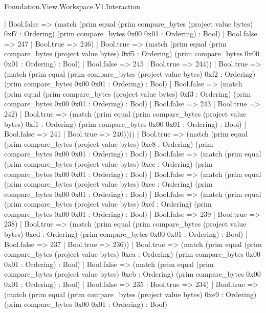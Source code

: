 \begin{lexlean}{Foundation.View.Workspace.V1.Interaction}
\begin{semanticmodule}
{                  | Bool.false => (match (prim equal (prim compare_bytes (project value bytes) 0xf7 : Ordering) (prim compare_bytes 0x00 0x01 : Ordering) : Bool)
                    | Bool.false => 247
                    | Bool.true => 246)
                  | Bool.true => (match (prim equal (prim compare_bytes (project value bytes) 0xf5 : Ordering) (prim compare_bytes 0x00 0x01 : Ordering) : Bool)
                    | Bool.false => 245
                    | Bool.true => 244))
                | Bool.true => (match (prim equal (prim compare_bytes (project value bytes) 0xf2 : Ordering) (prim compare_bytes 0x00 0x01 : Ordering) : Bool)
                  | Bool.false => (match (prim equal (prim compare_bytes (project value bytes) 0xf3 : Ordering) (prim compare_bytes 0x00 0x01 : Ordering) : Bool)
                    | Bool.false => 243
                    | Bool.true => 242)
                  | Bool.true => (match (prim equal (prim compare_bytes (project value bytes) 0xf1 : Ordering) (prim compare_bytes 0x00 0x01 : Ordering) : Bool)
                    | Bool.false => 241
                    | Bool.true => 240))))
            | Bool.true => (match (prim equal (prim compare_bytes (project value bytes) 0xe8 : Ordering) (prim compare_bytes 0x00 0x01 : Ordering) : Bool)
              | Bool.false => (match (prim equal (prim compare_bytes (project value bytes) 0xec : Ordering) (prim compare_bytes 0x00 0x01 : Ordering) : Bool)
                | Bool.false => (match (prim equal (prim compare_bytes (project value bytes) 0xee : Ordering) (prim compare_bytes 0x00 0x01 : Ordering) : Bool)
                  | Bool.false => (match (prim equal (prim compare_bytes (project value bytes) 0xef : Ordering) (prim compare_bytes 0x00 0x01 : Ordering) : Bool)
                    | Bool.false => 239
                    | Bool.true => 238)
                  | Bool.true => (match (prim equal (prim compare_bytes (project value bytes) 0xed : Ordering) (prim compare_bytes 0x00 0x01 : Ordering) : Bool)
                    | Bool.false => 237
                    | Bool.true => 236))
                | Bool.true => (match (prim equal (prim compare_bytes (project value bytes) 0xea : Ordering) (prim compare_bytes 0x00 0x01 : Ordering) : Bool)
                  | Bool.false => (match (prim equal (prim compare_bytes (project value bytes) 0xeb : Ordering) (prim compare_bytes 0x00 0x01 : Ordering) : Bool)
                    | Bool.false => 235
                    | Bool.true => 234)
                  | Bool.true => (match (prim equal (prim compare_bytes (project value bytes) 0xe9 : Ordering) (prim compare_bytes 0x00 0x01 : Ordering) : Bool)
}
\end{semanticmodule}
\end{lexlean}
